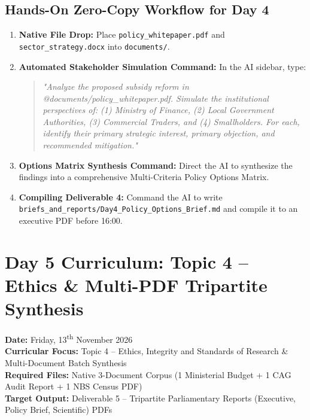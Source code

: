 \documentclass[11pt, a4paper]{report}
\begin{document}
\section{Hands-On Zero-Copy Workflow for Day 4}
\begin{enumerate}[label=\textbf{Step \arabic*:}]
    \item \textbf{Native File Drop:} Place \texttt{policy\_whitepaper.pdf} and \texttt{sector\_strategy.docx} into \texttt{documents/}.
    \item \textbf{Automated Stakeholder Simulation Command:} In the AI sidebar, type:
    \begin{quote}
        \small\textit{"Analyze the proposed subsidy reform in @documents/policy\_whitepaper.pdf. Simulate the institutional perspectives of: (1) Ministry of Finance, (2) Local Government Authorities, (3) Commercial Traders, and (4) Smallholders. For each, identify their primary strategic interest, primary objection, and recommended mitigation."}
    \end{quote}
    \item \textbf{Options Matrix Synthesis Command:} Direct the AI to synthesize the findings into a comprehensive Multi-Criteria Policy Options Matrix.
    \item \textbf{Compiling Deliverable 4:} Command the AI to write \texttt{briefs\_and\_reports/Day4\_Policy\_Options\_Brief.md} and compile it to an executive PDF before 16:00.
\end{enumerate}

\newpage

\chapter{Day 5 Curriculum: Topic 4 -- Ethics \& Multi-PDF Tripartite Synthesis}
\textbf{Date:} Friday, 13\textsuperscript{th} November 2026\\
\textbf{Curricular Focus:} Topic 4 -- Ethics, Integrity and Standards of Research \& Multi-Document Batch Synthesis\\
\textbf{Required Files:} Native 3-Document Corpus (1 Ministerial Budget + 1 CAG Audit Report + 1 NBS Census PDF)\\
\textbf{Target Output:} Deliverable 5 -- Tripartite Parliamentary Reports (Executive, Policy Brief, Scientific) PDFs
\end{document}
